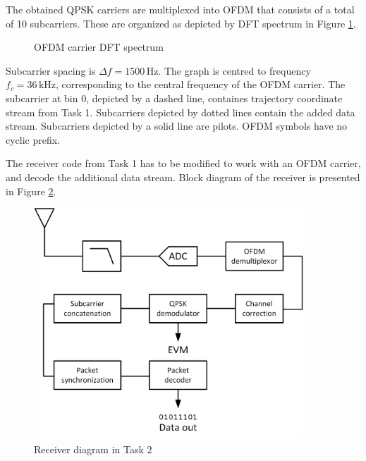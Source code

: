 \documentclass[a4paper]{article}
\begin{document}
The obtained QPSK carriers are multiplexed into OFDM that consists of a total of 10 subcarriers. These are organized as depicted by DFT spectrum in Figure \ref{fig:dft}.
\begin{figure}[h!]
	\centering
	\caption{OFDM carrier DFT spectrum}
	\label{fig:dft}
\end{figure}

Subcarrier spacing is $\varDelta f = 1500 \,\textrm{Hz}$. The graph is centred to frequency $f_c = 36 \,\textrm{kHz}$, corresponding to the central frequency of the OFDM carrier. The subcarrier at bin 0, depicted by a dashed line, containes trajectory coordinate stream from Task 1. Subcarriers depicted by dotted lines contain the added data stream. Subcarriers depicted by a solid line are pilots. OFDM symbols have no cyclic prefix.

The receiver code from Task 1 has to be modified to work with an OFDM carrier, and decode the additional data stream. Block diagram of the receiver is presented in Figure \ref{fig:task2}.

\begin{figure}[h!]
\centering
\includegraphics[width=0.9\textwidth]{Task2.png}
\caption{Receiver diagram in Task 2}
\label{fig:task2}
\end{figure}
\end{document}
